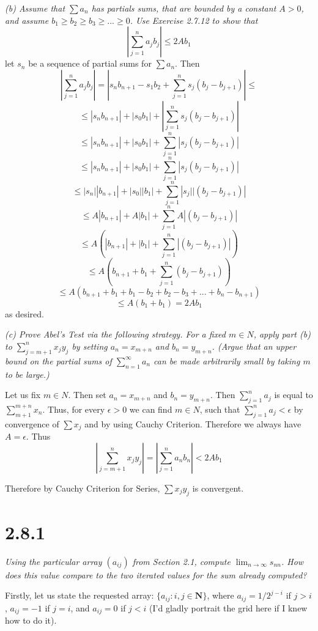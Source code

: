 \documentclass[11pt,oneside,titlepage]{article}
\begin{document}
\textit{(b) Assume that $\sum a_n$ has partials sums, that are bounded by a
  constant $A > 0$, and assume $b_1 \geq b_2 \geq b_3 \geq ... \geq 0$. Use
  Exercise 2.7.12 to show that }
$$\left|\sum_{j = 1}^{n} a_j b_j \right| \leq 2 A b_1$$
let $s_n$ be a sequence of partial sums for $\sum a_n$. Then
$$\left|\sum_{j = 1}^{n} a_j b_j \right| = \left|s_n b_{n + 1} - s_1 b_2 + \sum_{j = 1}^{n} s_j (b_j - b_{j + 1})\right| \leq $$
$$\leq |s_n b_{n + 1}| + |s_0 b_1| + \left|\sum_{j = 1}^{n} s_j (b_j - b_{j + 1})\right| $$
$$\leq |s_n b_{n + 1}| + |s_0 b_1| + \sum_{j = 1}^{n} \left|s_j (b_j - b_{j + 1})\right| $$
$$\leq |s_n b_{n + 1}| + |s_0 b_1| + \sum_{j = 1}^{n} \left|s_j (b_j - b_{j + 1})\right| $$
$$\leq |s_n ||b_{n + 1}| + |s_0 ||b_1| + \sum_{j = 1}^{n} \left|s_j|| (b_j - b_{j + 1})\right| $$
$$\leq A|b_{n + 1}| + A|b_1| + \sum_{j = 1}^{n} A \left| (b_j - b_{j + 1})\right| $$
$$\leq A(|b_{n + 1}| + |b_1| + \sum_{j = 1}^{n}  \left| (b_j - b_{j + 1})\right| )$$
$$\leq A(b_{n + 1} + b_1 + \sum_{j = 1}^{n}   (b_j - b_{j + 1}) )$$
$$\leq A(b_{n + 1} + b_1 + b_1 - b_2 + b_2 - b_3 + ... + b_n - b_{n + 1}) $$
$$\leq A(b_1 + b_1) = 2 A b_1 $$
as desired.

\textit{(c) Prove Abel's Test via the following strategy. For a fixed
  $m \in N$, apply part (b) to $\sum_{j = m + 1}^{n} x_j y_j $ by setting
  $a_n = x_{m + n}$ and $b_n = y_{m + n}$. (Argue that an upper bound on the
  partial sums of $\sum_{n = 1}^{\infty} a_n$ can be made arbitrarily small by
  taking $m$ to be large.)}

Let us fix $m \in N$. Then set $a_n = x_{m + n}$ and $b_n = y_{m + n}$. Then
$\sum_{j = 1}^{n} a_j$ is equal to $\sum_{m + 1}^{m + n} x_n$. Thus, for every
$\epsilon > 0$ we can find $m \in N$, such that
$\sum_{j = 1}^{n}a_j < \epsilon$ by convergence of $\sum x_j$ and by using
Cauchy Criterion. Therefore we always have $A = \epsilon$. Thus
$$|\sum_{j = m + 1}^{n} x_j y_j|= |\sum_{j = 1}^{n} a_n b_n| <2 A b_1$$

Therefore by Cauchy Criterion for Series, $\sum x_j y_j$ is convergent.

\section*{2.8.1}
\textit{Using the particular array $(a_{ij})$ from  Section 2.1, compute
  $\lim_{n \to \infty} s_{nn}$. How does this value compare to the two
  iterated values for the sum already computed? }

Firstly, let us state the requested array:  $\{a_{ij}: i,j \in \textbf{N}\}$,
where $a_{ij} = 1/2^{j - i}$ if $j > i$, $a_{ij} = -1$ if $j = i$, and
$a_{ij} = 0$ if $j < i$ (I'd gladly portrait the grid here if I knew how to
do it).
\end{document}
